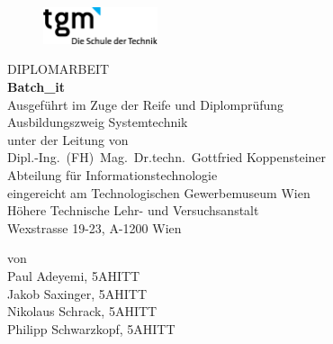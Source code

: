 

\def\tpdefault{{\sf \center \vspace*{-4cm}


\begin{figure}[h]
\begin{flushright}	
		\includegraphics[width=0.3\textwidth]{graphics/title/tgmlogo2.png}
	\label{fig:tgmlogo}
\end{flushright}
\end{figure}


\vspace{2cm}


{\Large %
DIPLOMARBEIT\\ \vspace{0.7cm}}
 {\LARGE \sloppy
{\bf \sf  \textbf{Batch\_it}
\\}}
%
%
\vspace*{2cm}
{\normalsize Ausgeführt im Zuge der Reife und Diplomprüfung\\
Ausbildungszweig Systemtechnik\\ %
  \vspace{1.5cm}
  \normalsize unter der Leitung von\\
  \large Dipl.-Ing.~(FH)\ Mag.\ Dr.techn.\ Gottfried Koppensteiner \\
  \normalsize Abteilung für
  Informationstechnologie\\
  \vspace{1.5cm}
  eingereicht am  Technologischen Gewerbemuseum Wien\\
  H\"ohere Technische Lehr- und Versuchsanstalt\\
  Wexstrasse 19-23, A-1200 Wien\\
  }}}


\begin{titlepage}
	\tpdefault
	{\sf \center \vspace{1.0cm}
	\normalsize von\\
	\large 
	Paul Adeyemi, 5AHITT\\
	Jakob Saxinger, 5AHITT\\
	Nikolaus Schrack, 5AHITT\\
	Philipp Schwarzkopf, 5AHITT\\
	\vspace {2 cm}
	\bf {} \\
	
	}



	\end{titlepage}

